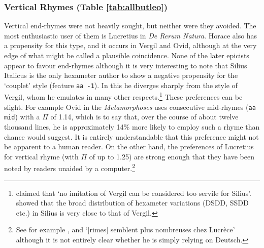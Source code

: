\documentclass[twocolumn, switch]{article} %
\begin{document}
\subsubsection{Vertical Rhymes (Table \ref{tab:allbutleo})} 

Vertical end-rhymes were not heavily sought, but neither were they avoided.
The most enthusiastic user of them is Lucretius in \emph{De Rerum Natura}.
Horace also has a propensity for this type, and it occurs in Vergil
and Ovid, although at the very edge of what might be called a plausible
coincidence. None of the later epicists appear to favour end-rhymes although
it is very interesting to note that Silius Italicus is the only hexameter
author to show a negative propensity for the `couplet' style (feature
\texttt{aa -1}). In this he diverges sharply from the style of Vergil, whom he
emulates in many other respects.\footnote{
   claimed that `no imitation of Vergil can be
  considered too servile for Silius'.  showed
  that the broad distribution of hexameter variations (DSDD, SSDD etc.) in Silius
  is very close to that of Vergil.
}
These preferences can be slight. For example Ovid in the \emph{Metamorphoses}
uses consecutive mid-rhymes (\texttt{aa mid}) with a $\Pi$ of 1.14, which is
to say that, over the course of about twelve thousand lines, he is
approximately 14\% more likely to employ such a rhyme than chance would
suggest. It is entirely understandable that this preference might not be
apparent to a human reader. On the other hand, the preferences of Lucretius
for vertical rhyme (with $\Pi$ of up to 1.25) are strong enough that they have
been noted by readers unaided by a computer.\footnote{
  See for example , and
   `[rimes] semblent plus nombreuses chez
  Lucrèce' although it is not entirely clear whether he is simply relying on
  Deutsch.
}
\end{document}
